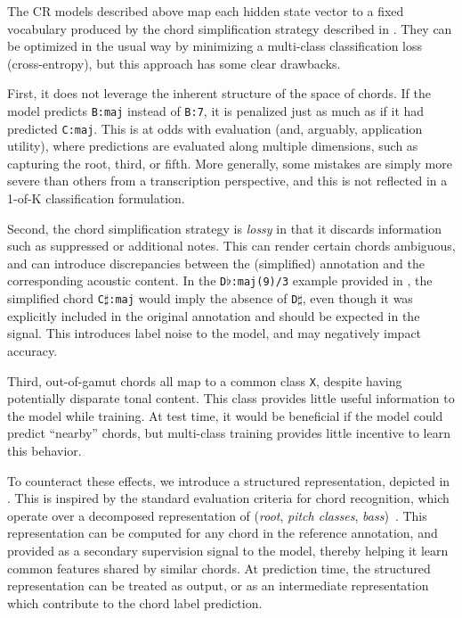 \documentclass{article}
\begin{document}
The CR models described above map each hidden state vector to a fixed vocabulary produced by the chord simplification strategy described in .
They can be optimized in the usual way by minimizing a multi-class classification loss (cross-entropy), but this approach has some clear drawbacks.

First, it does not leverage the inherent structure of the space of chords.
If the model predicts \texttt{B:maj} instead of \texttt{B:7}, it is penalized just as much as if it had predicted \texttt{C:maj}.
This is at odds with evaluation (and, arguably, application utility), where predictions are evaluated along multiple dimensions, such as capturing the root, third, or fifth.
More generally, some mistakes are simply more severe than others from a transcription perspective, and this is not reflected in a 1-of-K classification formulation.

Second, the chord simplification strategy is \emph{lossy} in that it discards information such as suppressed or additional notes.
This can render certain chords ambiguous, and can introduce discrepancies between the (simplified) annotation and the corresponding acoustic content.
In the \texttt{D}$\flat$\texttt{:maj{(9)}/3} example provided in , the simplified chord \texttt{C}$\sharp$\texttt{:maj} would imply the absence of \texttt{D}$\sharp$, even though it was explicitly included in the original annotation and should be expected in the signal.
This introduces label noise to the model, and may negatively impact accuracy.

Third, out-of-gamut chords all map to a common class \texttt{X}, despite having potentially disparate tonal content.
This class provides little useful information to the model while training.
At test time, it would be beneficial if the model could predict ``nearby'' chords, but multi-class training provides little incentive to learn this behavior.


To counteract these effects, we introduce a structured representation, depicted in .
This is inspired by the standard evaluation criteria for chord recognition, which operate over a decomposed representation of (\emph{root}, \emph{pitch classes}, \emph{bass})~\cite{raffel2014mir_eval}.
This representation can be computed for any chord in the reference annotation, and provided as a secondary supervision signal to the model, thereby helping it learn common features shared by similar chords.
At prediction time, the structured representation can be treated as output, or as an intermediate representation which contribute to the chord label prediction.
\end{document}
